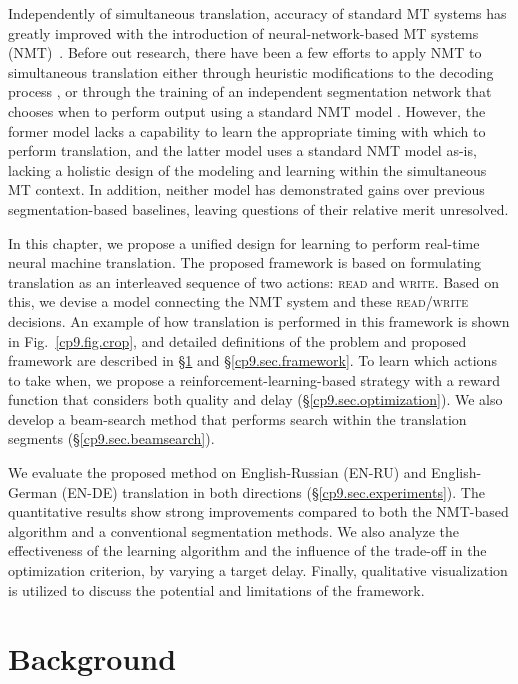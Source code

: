Independently of simultaneous translation, accuracy of standard MT systems has greatly improved with the introduction of neural-network-based MT systems (NMT)~\cite{sutskever2014sequence,bahdanau2014neural,vaswani2017attention}. Before out research, there have been a few efforts to apply NMT to simultaneous translation either through heuristic modifications to the decoding process \cite{cho2016can}, or through the training of an independent segmentation network that chooses when to perform output using a standard NMT model \cite{satija2016simultaneous}.
However, the former model lacks a capability to learn the appropriate timing with which to perform translation, and the latter model uses a standard NMT model as-is, lacking a holistic design of the modeling and learning within the simultaneous MT context.
In addition, neither model has demonstrated gains over previous segmentation-based baselines, leaving questions of their relative merit unresolved.

  
In this chapter, we propose a unified design for learning to perform real-time neural machine translation.
The proposed framework is based on formulating translation as an interleaved sequence of two actions: \textsc{read} and \textsc{write}.
Based on this, we devise a model connecting the NMT system and these \textsc{read}/\textsc{write} decisions.
An example of how translation is performed in this framework is shown in Fig.~\ref{cp9.fig.crop}, and detailed definitions of the problem and proposed framework are described in \S\ref{cp9.sec.definition} and \S\ref{cp9.sec.framework}.
To learn which actions to take when, we propose a reinforcement-learning-based strategy with a reward function that considers both quality and delay (\S\ref{cp9.sec.optimization}).
We also develop a beam-search method that performs search within the translation segments (\S\ref{cp9.sec.beamsearch}).

We evaluate the proposed method on English-Russian (EN-RU) and English-German (EN-DE) translation in both directions (\S\ref{cp9.sec.experiments}).
The quantitative results show strong improvements compared to both the NMT-based algorithm and a conventional segmentation methods.
We also analyze the effectiveness of the learning algorithm and the influence of the trade-off in the optimization criterion, by varying a target delay.
Finally, qualitative visualization is utilized to discuss the potential and limitations of the framework.


\section{Background}
\label{cp9.sec.definition}

